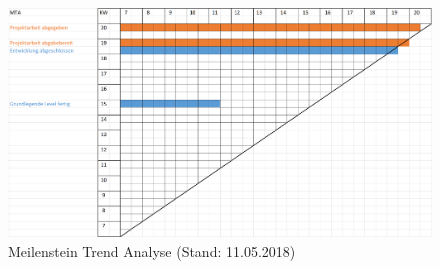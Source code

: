 \begin{figure}
\centering
\includegraphics[scale=0.64]{bilder/MTAS6.PNG}
\caption{Meilenstein Trend Analyse (Stand: 11.05.2018)}
\label{MTA6}
\end{figure}